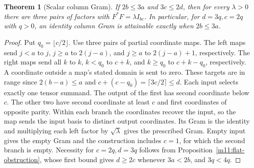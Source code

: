 \documentclass[11pt,reqno]{amsart}
\newtheorem{theorem}{Theorem}[section]
\theoremstyle{definition}
\theoremstyle{remark}
\numberwithin{equation}{section}
\begin{document}
\begin{theorem}[Scalar column Gram]\label{m11:scalar-gram}
If $2b\le3a$ and $3c\le2d$, then for every $\lambda>0$ there
are three pairs of factors with $F^*F=\lambda I_{bc}$. In
particular, for $d=3q,c=2q$ with $q>0$, an identity column Gram
is attainable exactly when $2b\le3a$.
\end{theorem}
\begin{proof}
Put $q_0=\lfloor c/2\rfloor$. Use three pairs of partial coordinate
maps. The left maps send $j<a$ to $j$, $j\ge a$ to $2(j-a)$,
and $j\ge a$ to $2(j-a)+1$, respectively. The right maps send
all $k$ to $k$, $k<q_0$ to $c+k$, and $k\ge q_0$ to $c+k-q_0$,
respectively. A coordinate outside a map's stated domain is sent to
zero. These targets are in range since $2(b-a)\le a$ and
$c+(c-q_0)=\lceil3c/2\rceil\le d$.
Each input selects exactly one tensor summand. The output of the
first has second coordinate below $c$. The other two have second
coordinate at least $c$ and first coordinates of opposite parity.
Within each branch the coordinates recover the input, so the map
sends the input basis to distinct output coordinates. Its Gram
is the identity and multiplying each left factor by $\sqrt\lambda$
gives the prescribed Gram. Empty input gives the empty Gram and
the construction includes $c=1$, for which the second branch is empty.
Necessity for $c=2q,d=3q$ follows from
Proposition~\ref{m11:flat-obstruction}, whose first bound gives
$d\ge2c$ whenever $3a<2b$, and $3q<4q$.
\end{proof}
\end{document}
